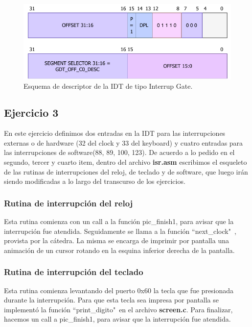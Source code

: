 \documentclass[a4paper]{article}
\begin{document}
\begin{figure}[h]
	\centering
	\includegraphics[scale=0.7]{img/IDTdescriptor.pdf}
	\caption{Esquema de descriptor de la IDT de tipo Interrup Gate.}
\end{figure}


\subsection{Ejercicio 3}
\justify
En este ejercicio definimos dos entradas en la IDT para las interrupciones externas o de hardware (32 del clock y 33 del keyboard) y cuatro entradas para las interrupciones de software(88, 89, 100, 123).
\justify
De acuerdo a lo pedido en el segundo, tercer y cuarto item, dentro del archivo \textbf{isr.asm} escribimos el esqueleto de las rutinas de interrupciones del reloj, de teclado y de software, que luego irán siendo modificadas a lo largo del transcurso de los ejercicios.


\subsubsection{Rutina de interrupción del reloj}
\justify
Esta rutina comienza con un call a la función pic_finish1, para avisar que la interrupción fue atendida. Seguidamente se llama a la función ``next_clock"\ , provista por la cátedra. La misma se encarga de imprimir por pantalla una animación de un cursor rotando en la esquina inferior derecha de la pantalla.


\subsubsection{Rutina de interrupción del teclado}
\justify
Esta rutina comienza levantando del puerto 0x60 la tecla que fue presionada durante la interrupción. Para que esta tecla sea impresa por pantalla se implementó la función ``print_digito"\ en el archivo \textbf{screen.c}. Para finalizar, hacemos un call a pic_finish1, para avisar que la interrupción fue atendida.
\end{document}

